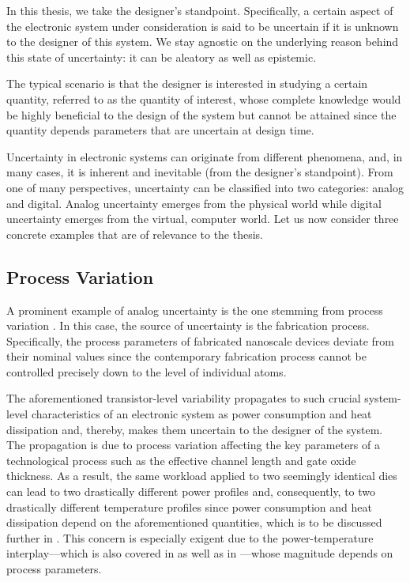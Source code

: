In this thesis, we take the designer's standpoint. Specifically, a certain
aspect of the electronic system under consideration is said to be uncertain if
it is unknown to the designer of this system. We stay agnostic on the underlying
reason behind this state of uncertainty: it can be aleatory as well as
epistemic.

The typical scenario is that the designer is interested in studying a certain
quantity, referred to as the quantity of interest, whose complete knowledge
would be highly beneficial to the design of the system but cannot be attained
since the quantity depends parameters that are uncertain at design time.

Uncertainty in electronic systems can originate from different phenomena, and,
in many cases, it is inherent and inevitable (from the designer's standpoint).
From one of many perspectives, uncertainty can be classified into two
categories: analog and digital. Analog uncertainty emerges from the physical
world while digital uncertainty emerges from the virtual, computer world. Let us
now consider three concrete examples that are of relevance to the thesis.

\subsection{Process Variation}

A prominent example of analog uncertainty is the one stemming from process
variation \cite{chandrakasan2000, srivastava2010}. In this case, the source of
uncertainty is the fabrication process. Specifically, the process parameters of
fabricated nanoscale devices deviate from their nominal values since the
contemporary fabrication process cannot be controlled precisely down to the
level of individual atoms.

The aforementioned transistor-level variability propagates to such crucial
system-level characteristics of an electronic system as power consumption and
heat dissipation and, thereby, makes them uncertain to the designer of the
system. The propagation is due to process variation affecting the key parameters
of a technological process such as the effective channel length and gate oxide
thickness. As a result, the same workload applied to two seemingly identical
dies can lead to two drastically different power profiles and, consequently, to
two drastically different temperature profiles since power consumption and heat
dissipation depend on the aforementioned quantities, which is to be discussed
further in . This concern is especially exigent due to the
power-temperature interplay---which is also covered in  as
well as in ---whose magnitude depends on
process parameters.

